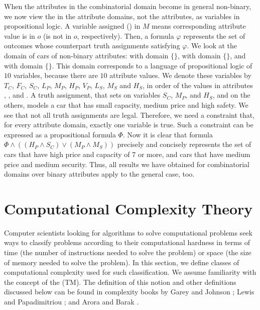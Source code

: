 When the attributes in the combinatorial domain become in general non-binary,
we now view the  in the attribute domains, not the attributes, 
as variables in propositional logic.
A variable assigned  () in $M$ means corresponding 
attribute value is in $o$ (is not in $o$, respectively).
Then, a formula $\varphi$ represents the set of outcomes whose counterpart
truth assignments satisfying $\varphi$.
We look at the domain of cars of non-binary attributes:
 with domain $\{$$\}$,
 with domain $\{$$\}$, and
 with domain $\{$$\}$.
This domain corresponds to a language of propositional logic of $10$ 
variables, because there are $10$ attribute values.
We denote these variables by $T_C$, $F_C$, $S_C$, $L_P$, $M_P$, $H_P$, $V_P$,
$L_S$, $M_S$ and $H_S$, in order of the
values in attributes , , and .
A truth assignment, that sets  on variables $S_C$, $M_P$, and
$H_S$, and  on the others,
models a car that has small capacity, medium price and high safety.
We see that not all truth assignments are legal.
Therefore, we need a constraint that, for every attribute domain,
exactly one variable is true.  Such a constraint can be
expressed as a propositional formula $\Phi$.
Now it is clear that formula $\Phi \land ((H_P \land S_C) \lor (M_P \land M_S))$ precisely
and concisely represents the set of cars that have high price and
capacity of 7 or more, and cars that have medium price and medium
security.
Thus, all results we have obtained for combinatorial domains over
binary attributes apply to the general case, too.


\section{Computational Complexity Theory \label{sec:comp_theory}}

Computer scientists looking for algorithms to solve computational problems
seek ways to classify problems according to their computational hardness
in terms of time (the number of instructions needed to solve the problem) 
or space (the size of memory needed to solve the problem).
In this section, we define classes of computational
complexity used for such classification.
We assume familiarity with the concept of the  (TM).
The definition of this notion and other definitions discussed 
below can be found in complexity
books by Garey and Johnson \cite{gar-joh:b:int}; Lewis and Papadimitriou
\cite{Lewis:Comput}; and Arora and Barak \cite{Arora:Comput}.



